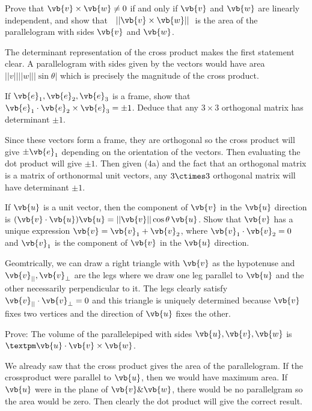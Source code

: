 \begin{problem}{5}
  Prove that \(\vb{v}\times\vb{w}\neq 0\) if and only if \(\vb{v}\) and \(\vb{w}\) are linearly independent, and show that 􏰀 \(||\vb{v}\times\vb{w}||\)􏰀 is the area of the parallelogram with sides \(\vb{v}\) and \(\vb{w}\).
\end{problem}
\begin{sol}
  The determinant representation of the cross product makes the first statement clear. A parallelogram with sides given by the vectors would have area \(||v||||w|||\sin\theta|\) which is precisely the magnitude of the cross product.
\end{sol}

\begin{problem}{6}
  If \(\vb{e}_1, \vb{e}_2, \vb{e}_3\) is a frame, show that \(\vb{e}_1\cdot\vb{e}_2\times\vb{e}_3 =\pm1\). Deduce that any \(3\times3\) orthogonal matrix has determinant \(\pm1\).
\end{problem}
\begin{sol}
  Since these vectors form a frame, they are orthogonal so the cross product will give \(\pm\vb{e}_1\) depending on the orientation of the vectors. Then evaluating the dot product will give \(\pm1\). Then given (4a) and the fact that an orthogonal matrix is a matrix of orthonormal unit vectors, any \(3\ctimes3\) orthogonal matrix will have determinant \(\pm1\).
\end{sol}

\begin{problem}{7}
  If \(\vb{u}\) is a unit vector, then the component of \(\vb{v}\) in the \(\vb{u}\) direction is \((\vb{v}\cdot\vb{u})\vb{u}=||\vb{v}||\cos\theta\,\vb{u}\).
  Show that \(\vb{v}\) has a unique expression \(\vb{v} = \vb{v}_1 + \vb{v}_2\), where \(\vb{v}_1\cdot\vb{v}_2 = 0\) and \(\vb{v}_1\) is the component of \(\vb{v}\) in the \(\vb{u}\) direction.
\end{problem}
\begin{sol}
  Geomtrically, we can draw a right triangle with \(\vb{v}\) as the hypotenuse and \(\vb{v}_{||},\vb{v}_\perp\) are the legs where we draw one leg parallel to \(\vb{u}\) and the other necessarily perpendicular to it. The legs clearly satisfy \(\vb{v}_{||}\cdot\vb{v}_\perp = 0\) and this triangle is uniquely determined because \(\vb{v}\) fixes two vertices and the direction of \(\vb{u}\) fixes the other.
\end{sol}

\begin{problem}{8}
  Prove: The volume of the parallelepiped with sides \(\vb{u}, \vb{v}, \vb{w}\) is \(±\vb{u}\cdot\vb{v}\times\vb{w}\).
\end{problem}
\begin{sol}
  We already saw that the cross product gives the area of the parallelogram. If the crossproduct were parallel to \(\vb{u}\), then we would have maximum area.
  If \(\vb{u}\) were in the plane of \(\vb{v}\&\vb{w}\), there would be no parallelgram so the area would be zero. Then clearly the dot product will give the correct result.
\end{sol}

